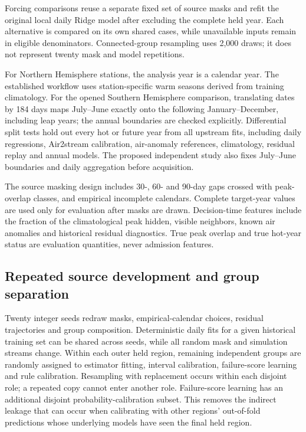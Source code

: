\documentclass[draft,linenumbers]{agujournal2025}
\begin{document}
Forcing comparisons reuse a separate fixed set of source masks and refit the original local daily Ridge model after excluding the complete held year. Each alternative is compared on its own shared cases, while unavailable inputs remain in eligible denominators. Connected-group resampling uses 2,000 draws; it does not represent twenty mask and model repetitions.

For Northern Hemisphere stations, the analysis year is a calendar year. The established workflow uses station-specific warm seasons derived from training climatology. For the opened Southern Hemisphere comparison, translating dates by 184 days maps July--June exactly onto the following January--December, including leap years; the annual boundaries are checked explicitly. Differential split tests hold out every hot or future year from all upstream fits, including daily regressions, Air2stream calibration, air-anomaly references, climatology, residual replay and annual models. The proposed independent study also fixes July--June boundaries and daily aggregation before acquisition.

The source masking design includes 30-, 60- and 90-day gaps crossed with peak-overlap classes, and empirical incomplete calendars. Complete target-year values are used only for evaluation after masks are drawn. Decision-time features include the fraction of the climatological peak hidden, visible neighbors, known air anomalies and historical residual diagnostics. True peak overlap and true hot-year status are evaluation quantities, never admission features.

\subsection{Repeated source development and group separation}
Twenty integer seeds redraw masks, empirical-calendar choices, residual trajectories and group composition. Deterministic daily fits for a given historical training set can be shared across seeds, while all random mask and simulation streams change. Within each outer held region, remaining independent groups are randomly assigned to estimator fitting, interval calibration, failure-score learning and rule calibration. Resampling with replacement occurs within each disjoint role; a repeated copy cannot enter another role. Failure-score learning has an additional disjoint probability-calibration subset. This removes the indirect leakage that can occur when calibrating with other regions' out-of-fold predictions whose underlying models have seen the final held region.
\end{document}
